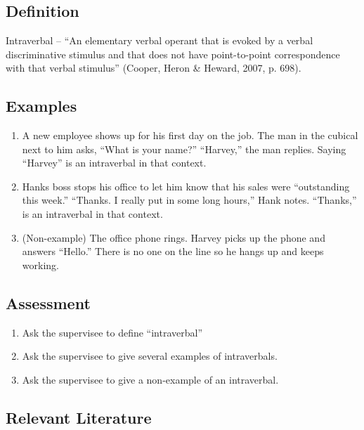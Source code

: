 \section{\fourFKFourtySix{}}
\subsection{Definition} 
Intraverbal – ``An elementary verbal operant that is evoked by a verbal discriminative stimulus and that does not have point-to-point correspondence with that verbal stimulus'' (Cooper, Heron \& Heward, 2007, p. 698).
%
\subsection{Examples}
\begin{enumerate}
\item A new employee shows up for his first day on the job. The man in the cubical next to him asks, ``What is your name?''  ``Harvey,'' the man replies. Saying ``Harvey'' is an intraverbal in that context.
\item Hanks boss stops his office to let him know that his sales were ``outstanding this week.''  ``Thanks. I really put in some long hours,'' Hank notes.  ``Thanks,'' is an intraverbal in that context.
\item (Non-example) The office phone rings. Harvey picks up the phone and answers ``Hello.'' There is no one on the line so he hangs up and keeps working. 
%
\end{enumerate}
%
\subsection{Assessment}
\begin{enumerate}
\item Ask the supervisee to define ``intraverbal''  
\item Ask the supervisee to give several examples of intraverbals.
\item Ask the supervisee to give a non-example of an intraverbal.
%
\end{enumerate}
%
\subsection{Relevant Literature}
\begin{refsection}
\nocite{test,alang2017police,clayton2018black}
\printbibliography[heading=none]
\end{refsection}
%
